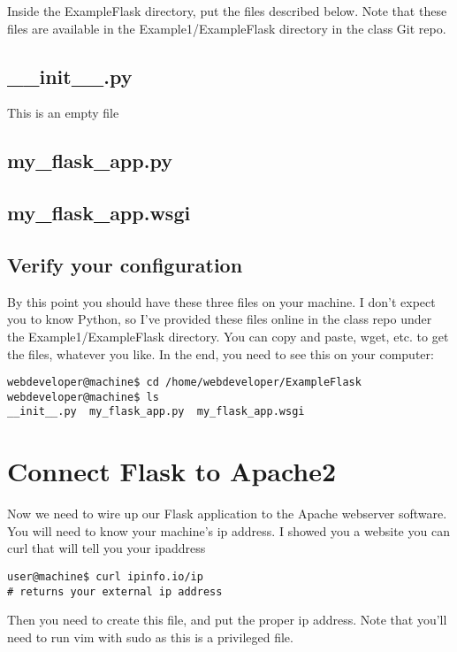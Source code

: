 \documentclass[10pt]{article}
\begin{document}
Inside the ExampleFlask directory, put the files described below. Note that these files are available in the Example1/ExampleFlask directory in the class Git repo.

\subsection{\_\_init\_\_.py}
This is an empty file

\subsection{my\_flask\_app.py}


\subsection{my\_flask\_app.wsgi}


\subsection{Verify your configuration}
By this point you should have these three files on your machine. I don't expect
you to know Python, so I've provided these files online in the class repo under
the Example1/ExampleFlask directory. You can copy and paste, wget, etc. to get
the files, whatever you like. In the end, you need to see this on your computer:

\begin{lstlisting}
webdeveloper@machine$ cd /home/webdeveloper/ExampleFlask
webdeveloper@machine$ ls
__init__.py  my_flask_app.py  my_flask_app.wsgi
\end{lstlisting}

\section{Connect Flask to Apache2}
Now we need to wire up our Flask application to the Apache webserver software. You will need to know your machine's ip address. I showed you a website you can curl that will tell you your ipaddress

\begin{lstlisting}
user@machine$ curl ipinfo.io/ip
# returns your external ip address
\end{lstlisting}

Then you need to create this file, and put the proper ip address. Note that you'll need to run vim with sudo as this is a privileged file.
\end{document}

